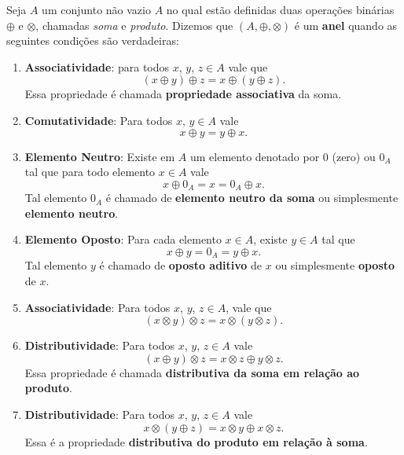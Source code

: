 \begin{definicao}
	Seja $A$ um conjunto n{\~a}o vazio $A$ no qual est\~ao definidas duas opera{\c c}{\~o}es bin\'arias $\oplus$ e $\otimes$, chamadas \textit{soma} e \textit{produto}.  Dizemos que $(A, \oplus, \otimes)$ {\'e} um \textbf{anel} quando as seguintes condi{\c c}{\~o}es s{\~a}o verdadeiras:
	\begin{enumerate}[label={\roman*})]
		\item \textbf{Associatividade}: para todos $x$, $y$, $z \in A$ vale que
		\[
			(x \oplus y) \oplus z = x \oplus (y \oplus z).
		\]
		Essa propriedade {\'e} chamada \textbf{propriedade associativa} da soma.

		\item \textbf{Comutatividade}: Para todos $x$, $y \in A$ vale
		\[
			x \oplus y = y \oplus x.
		\]

		\item \textbf{Elemento Neutro}: Existe em $A$ um elemento denotado por $0$ (zero) ou $0_{A}$ tal que para todo elemento $x \in A$ vale
		\[
			x \oplus 0_A = x = 0_A \oplus x.
		\]
		Tal elemento $0_A$ \'e chamado de \textbf{elemento neutro da soma} ou simplesmente \textbf{elemento neutro}.

		\item \textbf{Elemento Oposto}: Para cada elemento $x \in A$, existe $y \in A$ tal que
		\[
			x \oplus y = 0_A = y \oplus x.
		\]
		Tal elemento $y$ \'e chamado de \textbf{oposto aditivo} de $x$ ou simplesmente \textbf{oposto} de $x$.

		\item \textbf{Associatividade}: Para todos $x$, $y$, $z \in A$, vale que
		\[
			(x\otimes y) \otimes z = x\otimes (y\otimes z).
		\]

		\item \textbf{Distributividade}: Para todos $x$, $y$, $z \in A$ vale
		\[
			(x \oplus y)\otimes z = x\otimes z \oplus y\otimes z.
		\]
		Essa propriedade {\'e} chamada \textbf{distributiva da soma em rela{\c c}{\~a}o ao produto}.
		
		\item \textbf{Distributividade}: Para todos $x$, $y$, $z \in A$ vale
		\[
			x\otimes(y \oplus z) = x\otimes y \oplus x\otimes z.
		\]
		Essa {\'e} a propriedade \textbf{distributiva do produto em rela{\c c}{\~a}o {\`a} soma}.
	\end{enumerate}
\end{definicao}

